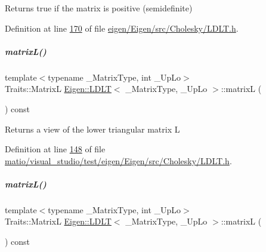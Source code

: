 \begin{DoxyReturn}{Returns}
true if the matrix is positive (semidefinite) 
\end{DoxyReturn}


Definition at line \hyperlink{eigen_2_eigen_2src_2_cholesky_2_l_d_l_t_8h_source_l00170}{170} of file \hyperlink{eigen_2_eigen_2src_2_cholesky_2_l_d_l_t_8h_source}{eigen/\+Eigen/src/\+Cholesky/\+L\+D\+L\+T.\+h}.

\mbox{\label{group___cholesky___module_af0e6a0df5679873b42cf82a372dd8ddb}} 
\subparagraph{\texorpdfstring{matrix\+L()}{matrixL()}\hspace{0.1cm}{\footnotesize\ttfamily [1/2]}}
{\footnotesize\ttfamily template$<$typename \+\_\+\+Matrix\+Type, int \+\_\+\+Up\+Lo$>$ \\
Traits\+::\+MatrixL \hyperlink{group___cholesky___module_class_eigen_1_1_l_d_l_t}{Eigen\+::\+L\+D\+LT}$<$ \+\_\+\+Matrix\+Type, \+\_\+\+Up\+Lo $>$\+::matrixL (\begin{DoxyParamCaption}{ }\end{DoxyParamCaption}) const\hspace{0.3cm}{\ttfamily [inline]}}

\begin{DoxyReturn}{Returns}
a view of the lower triangular matrix L 
\end{DoxyReturn}


Definition at line \hyperlink{matio_2visual__studio_2test_2eigen_2_eigen_2src_2_cholesky_2_l_d_l_t_8h_source_l00148}{148} of file \hyperlink{matio_2visual__studio_2test_2eigen_2_eigen_2src_2_cholesky_2_l_d_l_t_8h_source}{matio/visual\+\_\+studio/test/eigen/\+Eigen/src/\+Cholesky/\+L\+D\+L\+T.\+h}.

\mbox{\label{group___cholesky___module_af0e6a0df5679873b42cf82a372dd8ddb}} 
\subparagraph{\texorpdfstring{matrix\+L()}{matrixL()}\hspace{0.1cm}{\footnotesize\ttfamily [2/2]}}
{\footnotesize\ttfamily template$<$typename \+\_\+\+Matrix\+Type, int \+\_\+\+Up\+Lo$>$ \\
Traits\+::\+MatrixL \hyperlink{group___cholesky___module_class_eigen_1_1_l_d_l_t}{Eigen\+::\+L\+D\+LT}$<$ \+\_\+\+Matrix\+Type, \+\_\+\+Up\+Lo $>$\+::matrixL (\begin{DoxyParamCaption}{ }\end{DoxyParamCaption}) const\hspace{0.3cm}{\ttfamily [inline]}}

